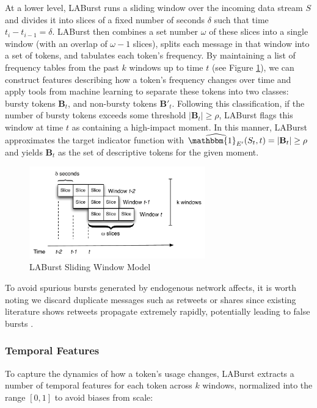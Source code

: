 \documentclass[letterpaper]{article}
\begin{document}
At a lower level, LABurst runs a sliding window over the incoming data stream $S$ and divides it into slices of a fixed number of seconds $\delta$ such that time $t_{i} - t_{i-1} = \delta$.
LABurst then combines a set number $\omega$ of these slices into a single window (with an overlap of $\omega - 1$ slices), splits each message in that window into a set of tokens, and tabulates each token's frequency.
By maintaining a list of frequency tables from the past $k$ windows up to time $t$ (see Figure \ref{fig:windowSlices}), we can construct features describing how a token's frequency changes over time and apply tools from machine learning to separate these tokens into two classes: bursty tokens $\mathbf{B}_t$, and non-bursty tokens $\mathbf{B}'_t$.
Following this classification, if the number of bursty tokens exceeds some threshold $|\mathbf{B}_t| \ge \rho$, LABurst flags this window at time $t$ as containing a high-impact moment.
In this manner, LABurst approximates the target indicator function with $\widehat{\mathbbm{1}_{E'}}(S_t, t) = |\mathbf{B}_t| \ge \rho$ and yields $\mathbf{B}_t$ as the set of descriptive tokens for the given moment.

\begin{figure}[hbtp]
\begin{center}
\includegraphics[width=3in]{./figures/laburst.pdf}
\caption{LABurst Sliding Window Model}
\label{fig:windowSlices}
\end{center}
\end{figure}

To avoid spurious bursts generated by endogenous network affects, it is worth noting we discard duplicate messages such as retweets or shares since existing literature shows retweets propagate extremely rapidly, potentially leading to false bursts \cite{kwak2010twitter}.

\subsubsection{Temporal Features}

To capture the dynamics of how a token's usage changes, LABurst extracts a number of temporal features for each token across $k$ windows, normalized into the range $[0, 1]$ to avoid biases from scale:
\end{document}
